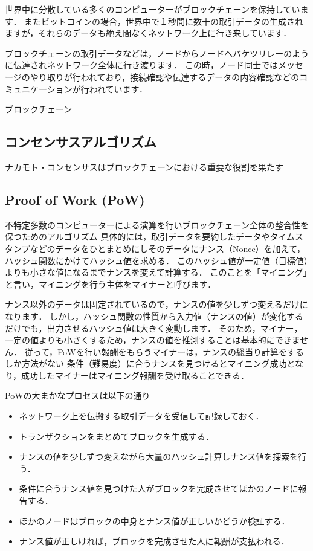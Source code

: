 \documentclass[a4paper,12pt]{jsarticle}
\begin{document}
世界中に分散している多くのコンピューターがブロックチェーンを保持しています．
またビットコインの場合，世界中で１秒間に数十の取引データの生成されますが，それらのデータも絶え間なくネットワーク上に行き来しています．

ブロックチェーンの取引データなどは，ノードからノードへバケツリレーのように伝達されネットワーク全体に行き渡ります．
この時，ノード同士ではメッセージのやり取りが行われており，接続確認や伝達するデータの内容確認などのコミュニケーションが行われています．

ブロックチェーン

      \subsection{コンセンサスアルゴリズム}
      
ナカモト・コンセンサスはブロックチェーンにおける重要な役割を果たす


      \subsection{Proof of Work (PoW)}%
不特定多数のコンピューターによる演算を行いブロックチェーン全体の整合性を保つためのアルゴリズム
具体的には，取引データを要約したデータやタイムスタンプなどのデータをひとまとめにしそのデータにナンス（Nonce）を加えて，ハッシュ関数にかけてハッシュ値を求める．
このハッシュ値が一定値（目標値）よりも小さな値になるまでナンスを変えて計算する．
このことを「マイニング」と言い，マイニングを行う主体をマイナーと呼びます．


ナンス以外のデータは固定されているので，ナンスの値を少しずつ変えるだけになります．
しかし，ハッシュ関数の性質から入力値（ナンスの値）が変化するだけでも，出力させるハッシュ値は大きく変動します．
そのため，マイナー，一定の値よりも小さくするため，ナンスの値を推測することは基本的にできません．
従って，PoWを行い報酬をもらうマイナーは，ナンスの総当り計算をするしか方法がない
条件（難易度）に合うナンスを見つけるとマイニング成功となり，成功したマイナーはマイニング報酬を受け取ることできる．

PoWの大まかなプロセスは以下の通り
\begin{itemize}
  \item ネットワーク上を伝搬する取引データを受信して記録しておく．
  \item トランザクションをまとめてブロックを生成する．
  \item ナンスの値を少しずつ変えながら大量のハッシュ計算しナンス値を探索を行う．
  \item 条件に合うナンス値を見つけた人がブロックを完成させてほかのノードに報告する．
  \item ほかのノードはブロックの中身とナンス値が正しいかどうか検証する．
  \item ナンス値が正しければ，ブロックを完成させた人に報酬が支払われる．
\end{itemize}
\end{document}
